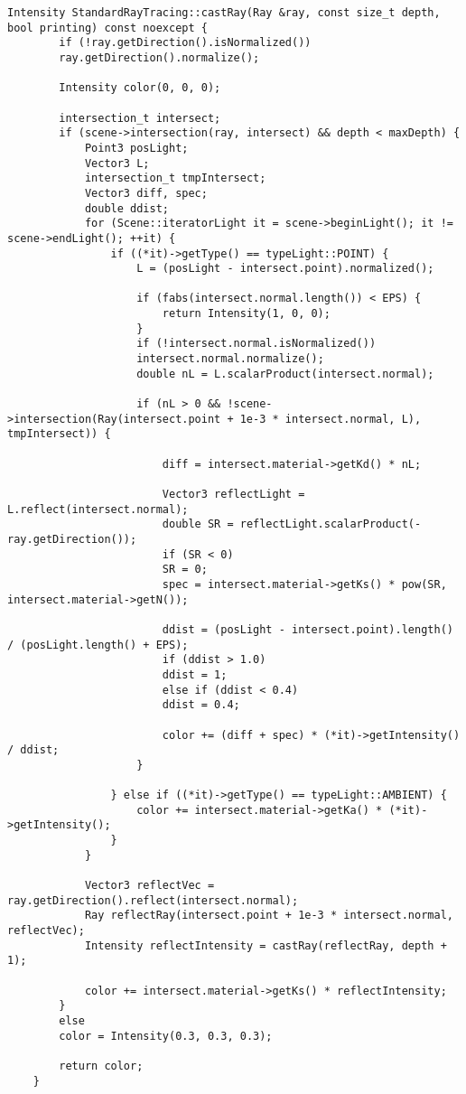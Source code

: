 \begin{center}
	\captionsetup{justification=raggedright,singlelinecheck=off}
	\renewcommand{\lstlistingname}{Листинг}
	\begin{lstlisting}[label=lst:castRay, caption=Реализация алгоритма испускания луча]
	Intensity StandardRayTracing::castRay(Ray &ray, const size_t depth, bool printing) const noexcept {
		if (!ray.getDirection().isNormalized())
		ray.getDirection().normalize();
		
		Intensity color(0, 0, 0);
		
		intersection_t intersect;
		if (scene->intersection(ray, intersect) && depth < maxDepth) {
			Point3 posLight;  
			Vector3 L;          
			intersection_t tmpIntersect;
			Vector3 diff, spec;
			double ddist;
			for (Scene::iteratorLight it = scene->beginLight(); it != scene->endLight(); ++it) {
				if ((*it)->getType() == typeLight::POINT) {
					L = (posLight - intersect.point).normalized();  
					
					if (fabs(intersect.normal.length()) < EPS) {
						return Intensity(1, 0, 0);
					}
					if (!intersect.normal.isNormalized())
					intersect.normal.normalize();
					double nL = L.scalarProduct(intersect.normal);  
					
					if (nL > 0 && !scene->intersection(Ray(intersect.point + 1e-3 * intersect.normal, L), tmpIntersect)) {
						
						diff = intersect.material->getKd() * nL;
						
						Vector3 reflectLight = L.reflect(intersect.normal);
						double SR = reflectLight.scalarProduct(-ray.getDirection());
						if (SR < 0)
						SR = 0;
						spec = intersect.material->getKs() * pow(SR, intersect.material->getN());
						
						ddist = (posLight - intersect.point).length() / (posLight.length() + EPS);
						if (ddist > 1.0)
						ddist = 1;
						else if (ddist < 0.4)
						ddist = 0.4;
						
						color += (diff + spec) * (*it)->getIntensity() / ddist;  
					}
					
				} else if ((*it)->getType() == typeLight::AMBIENT) {
					color += intersect.material->getKa() * (*it)->getIntensity();
				}
			}
			
			Vector3 reflectVec = ray.getDirection().reflect(intersect.normal);
			Ray reflectRay(intersect.point + 1e-3 * intersect.normal, reflectVec);
			Intensity reflectIntensity = castRay(reflectRay, depth + 1);

			color += intersect.material->getKs() * reflectIntensity;
		}
		else 
		color = Intensity(0.3, 0.3, 0.3);
		
		return color;
	}
	\end{lstlisting}
\end{center}
\clearpage


